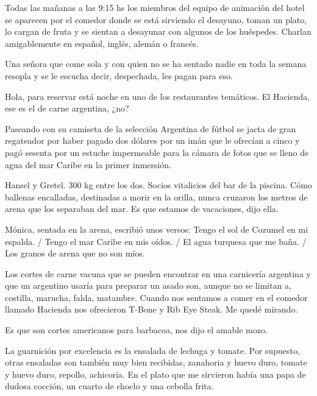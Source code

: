 \documentclass[11pt,twoside,openright,a6paper]{book}
\begin{document}
\vspace{1.5cm}
Todas las mañanas a las 9:15 hs los miembros del equipo de animación del hotel se aparecen por el comedor donde se está sirviendo el desayuno, toman un plato, lo cargan de fruta y se sientan a desayunar con algunos de los huéspedes. Charlan amigablemente en español, inglés, alemán o francés.

Una señora que come sola y con quien no se ha sentado nadie en toda la semana resopla y se le escucha decir, despechada, les pagan para eso.


\vspace{1.5cm}
Hola, para reservar está noche en uno de los restaurantes temáticos. El Hacienda, ese es el de carne argentina, ¿no?


\vspace{1.5cm}
Paseando con su camiseta de la selección Argentina de fútbol se jacta de gran regateador por haber pagado dos dólares por un imán que le ofrecían a cinco y pagó sesenta por un estuche impermeable para la cámara de fotos que se lleno de agua del mar Caribe en la primer inmersión.


\vspace{1.5cm}
Hansel y Gretel. 300 kg entre los dos. Socios vitalicios del bar de la piscina. Cómo ballenas encalladas, destinadas a morir en la orilla, nunca cruzaron los metros de arena que los separaban del mar. Es que estamos de vacaciones, dijo ella.


\vspace{1.5cm}
Mónica, sentada en la arena, escribió unos versos: Tengo el sol de Cozumel en mi espalda. / Tengo el mar Caribe en mis oídos. / El agua turquesa que me baña. / Los granos de arena que no son míos.


\vspace{1.5cm}
Los cortes de carne vacuna que se pueden encontrar en una carnicería argentina y que un argentino usaría para preparar un asado son, aunque no se limitan a, costilla, marucha, falda, matambre. Cuando nos sentamos a comer en el comedor llamado Hacienda nos ofrecieron T-Bone y Rib Eye Steak. Me quedé mirando.

Es que son cortes americanos para barbacoa, nos dijo el amable mozo.

La guarnición por excelencia es la ensalada de lechuga y tomate. Por supuesto, otras ensaladas son también muy bien recibidas, zanahoria y huevo duro, tomate y huevo duro, repollo, achicoria. En el plato que me sirvieron había una papa de dudosa cocción, un cuarto de choclo y una cebolla frita.
\end{document}
